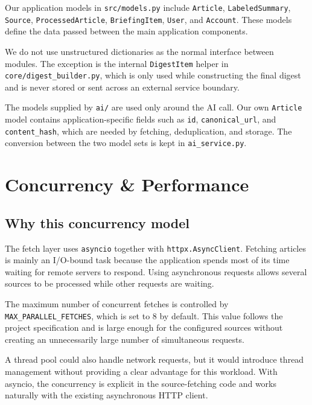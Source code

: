 \documentclass[11pt,a4paper]{article}
\begin{document}
Our application models in \texttt{src/models.py} include \texttt{Article}, \texttt{LabeledSummary}, \texttt{Source}, \texttt{ProcessedArticle}, \texttt{BriefingItem}, \texttt{User}, and \texttt{Account}. These models define the data passed between the main application components.

We do not use unstructured dictionaries as the normal interface between modules. The exception is the internal \texttt{DigestItem} helper in \texttt{core/digest\_builder.py}, which is only used while constructing the final digest and is never stored or sent across an external service boundary.

The models supplied by \texttt{ai/} are used only around the AI call. Our own \texttt{Article} model contains application-specific fields such as \texttt{id}, \texttt{canonical\_url}, and \texttt{content\_hash}, which are needed by fetching, deduplication, and storage. The conversion between the two model sets is kept in \texttt{ai\_service.py}.

\section{Concurrency \& Performance}\label{sec:concurrency}

\subsection{Why this concurrency model}

The fetch layer uses \texttt{asyncio} together with \texttt{httpx.AsyncClient}. Fetching articles is mainly an I/O-bound task because the application spends most of its time waiting for remote servers to respond. Using asynchronous requests allows several sources to be processed while other requests are waiting.

The maximum number of concurrent fetches is controlled by \texttt{MAX\_PARALLEL\_FETCHES}, which is set to 8 by default. This value follows the project specification and is large enough for the configured sources without creating an unnecessarily large number of simultaneous requests.

A thread pool could also handle network requests, but it would introduce thread management without providing a clear advantage for this workload. With asyncio, the concurrency is explicit in the source-fetching code and works naturally with the existing asynchronous HTTP client.
\end{document}
